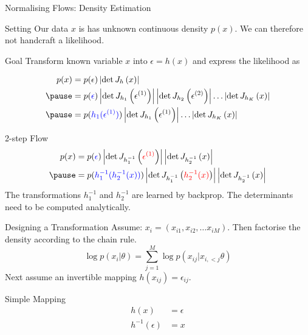 \documentclass[14pt]{beamer}
\begin{document}
\begin{frame}{Normalising Flows: Density Estimation}
\begin{block}{Setting}
Our data $ x $ is has unknown continuous density $ p(x) $.
We can therefore not handcraft a likelihood.
\end{block}
\pause
\begin{block}{Goal}
Transform known variable $ x $ into $ \epsilon = h(x) $ and express the likelihood as
\begin{small}
\pause
\begin{equation*}
\begin{aligned}
p(x) &= p(\epsilon)\djac{h}{x} \\ \pause
&= p(\textcolor{blue}{\epsilon})\djac{h_{1}}{\epsilon^{(1)}}\djac{h_{2}}{\epsilon^{(2)}}\ldots \djac{h_{K}}{x} \\ \pause
&= p(\textcolor{blue}{h_{1}(\epsilon^{(1)})})\djac{h_{1}}{\epsilon^{(1)}}\ldots \djac{h_{K}}{x}
\end{aligned}
\end{equation*}
\end{small}
\end{block}
\end{frame}

\begin{frame}{2-step Flow}
\begin{equation*}
\begin{aligned}
p(x) &= p(\textcolor{blue}{\epsilon})\djac{h_{1}^{-1}}{\textcolor{red}{\epsilon^{(1)}}}\djac{h_{2}^{-1}}{x} \\ \pause
&= p(\textcolor{blue}{h_{1}^{-1}(h_{2}^{-1}(x))})\djac{h_{1}^{-1}}{\textcolor{red}{h_{2}^{-1}(x)}}\djac{h_{2}^{-1}}{x}
\end{aligned}
\end{equation*}
\pause
The transformations $ h^{-1}_{1} $ and $ h^{-1}_{2} $ are learned by backprop. The determinants need to be computed analytically.
\end{frame}

\begin{frame}{Designing a Transformation}
Assume: $ x_{i} = (x_{i1}, x_{i2}, \ldots x_{iM}) $.
Then factorise the density according to the chain rule.
\begin{equation*}
\log p(x_{i}|\theta) = \sum_{j=1}^{M} \log p(x_{ij}|x_{i,<j}\theta)
\end{equation*}
Next assume an invertible mapping $ h(x_{ij}) = \epsilon_{ij} $.
\begin{block}{Simple Mapping}
\begin{equation*}
\begin{aligned}
h(x) &= \epsilon \\
h^{-1}(\epsilon) &= x
\end{aligned}
\end{equation*}
\end{block}
\end{frame}
\end{document}
